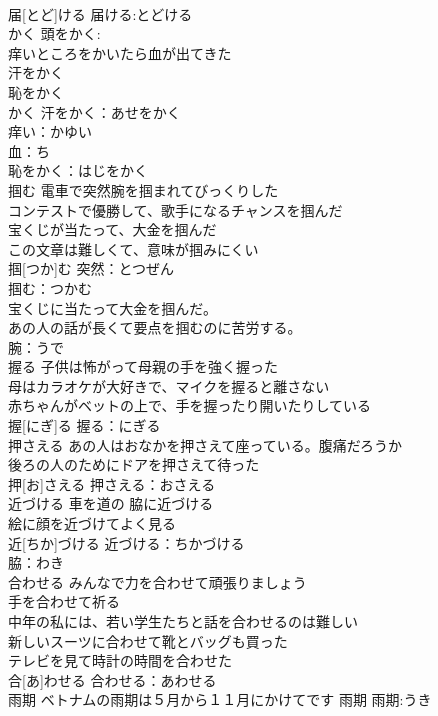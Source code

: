 \documentclass[8pt]{extreport}
\begin{document}
\begin{CJK}{UTF8}{min}
\\	届[とど]ける			届ける:とどける
\\	かく	頭をかく: 
\\	痒いところをかいたら血が出てきた 
\\	汗をかく 
\\	恥をかく 
\\	かく			汗をかく：あせをかく
\\	痒い：かゆい
\\	血：ち
\\	恥をかく：はじをかく
\\	掴む	電車で突然腕を掴まれてびっくりした 
\\	コンテストで優勝して、歌手になるチャンスを掴んだ 
\\	宝くじが当たって、大金を掴んだ 
\\	この文章は難しくて、意味が掴みにくい 
\\	掴[つか]む				突然：とつぜん
\\	掴む：つかむ
\\	宝くじに当たって大金を掴んだ。 
\\	あの人の話が長くて要点を掴むのに苦労する。 
\\	腕：うで
\\	握る	子供は怖がって母親の手を強く握った 
\\	母はカラオケが大好きで、マイクを握ると離さない 
\\	赤ちゃんがベットの上で、手を握ったり開いたりしている 
\\	握[にぎ]る			握る：にぎる
\\	押さえる	あの人はおなかを押さえて座っている。腹痛だろうか 
\\	後ろの人のためにドアを押さえて待った 
\\	押[お]さえる			押さえる：おさえる
\\	近づける	車を道の 脇に近づける 
\\	絵に顔を近づけてよく見る 
\\	近[ちか]づける			近づける：ちかづける
\\	脇：わき
\\	合わせる	みんなで力を合わせて頑張りましょう 
\\	手を合わせて祈る 
\\	中年の私には、若い学生たちと話を合わせるのは難しい 
\\	新しいスーツに合わせて靴とバッグも買った 
\\	テレビを見て時計の時間を合わせた 
\\	合[あ]わせる			合わせる：あわせる
\\	雨期	ベトナムの雨期は５月から１１月にかけてです	雨期			雨期:うき

\end{CJK}
\end{document}
